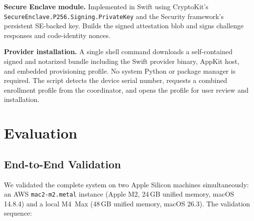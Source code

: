 \documentclass[10pt,twocolumn,letterpaper]{article}
\begin{document}
\textbf{Secure Enclave module.} Implemented in Swift using CryptoKit's \texttt{SecureEnclave.P256.Signing.PrivateKey} and the Security framework's persistent SE-backed key. Builds the signed attestation blob and signs challenge responses and code-identity nonces.

\textbf{Provider installation.} A single shell command downloads a self-contained signed and notarized bundle including the Swift provider binary, AppKit host, and embedded provisioning profile. No system Python or package manager is required. The script detects the device serial number, requests a combined enrollment profile from the coordinator, and opens the profile for user review and installation.

\section{Evaluation}
\label{sec:eval}

\subsection{End-to-End Validation}

We validated the complete system on two Apple Silicon machines simultaneously: an AWS \texttt{mac2-m2.metal} instance (Apple M2, 24\,GB unified memory, macOS 14.8.4) and a local M4~Max (48\,GB unified memory, macOS 26.3). The validation sequence:
\end{document}

